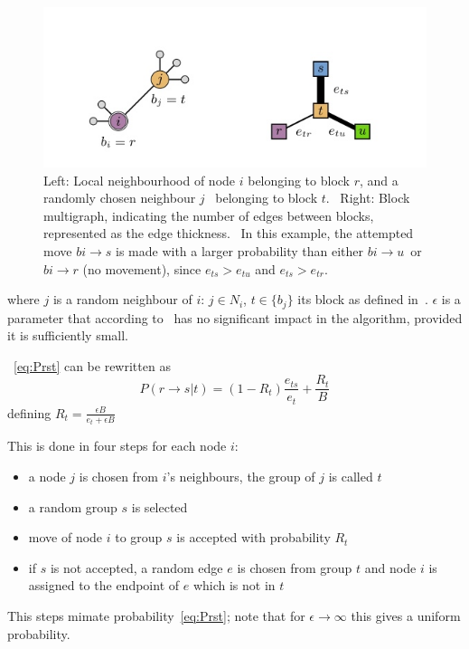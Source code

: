 \begin{figure}[htb!]
  \centering
  \includegraphics[width=0.9\linewidth]{pictures/topic/topic_pixioto_move.jpg}
  \caption{Left: Local neighbourhood of node $i$ belonging to block $r$, and a randomly chosen neighbour $j$ \
  belonging to block $t$. \
  Right: Block multigraph, indicating the number of edges between blocks, represented as the edge thickness. \
  In this example, the attempted move $bi \to s$ is made with a larger probability than either $bi \to u$\
   or $bi \to r$ (no movement), since $e_{ts}>e_{tu}$ and $e_{ts}>e_{tr}$.}
  \label{fig:topic_pixioto_move}
\end{figure}

where $j$ is a random neighbour of $i$: $j\in N_i$, $t\in\{b_j\}$ its block as defined in~\cite{peixoto2014efficient}.
$\epsilon$ is a parameter that according to~\cite{peixoto2017nonparametric} has no significant impact in the algorithm,
provided it is sufficiently small.

~\ref{eq:Prst} can be rewritten as \[P(r\to s|t)=(1-R_t)\frac{e_{ts}}{e_t}+\frac{R_t}{B}\]
defining $R_t=\frac{\epsilon B}{e_t + \epsilon B}$

This is done in four steps for each node $i$:
\begin{itemize}
  \item a node $j$ is chosen from $i$'s neighbours, the group of $j$ is called
  $t$
  \item a random group $s$ is selected
  \item move of node $i$ to group $s$ is accepted with probability $R_t$
  \item if $s$ is not accepted, a random edge $e$ is chosen from group $t$ and node $i$ is assigned to the endpoint of $e$ which is not in $t$
\end{itemize}
This steps mimate probability~\ref{eq:Prst}; note that for $\epsilon\to\infty$ this gives a uniform probability.

